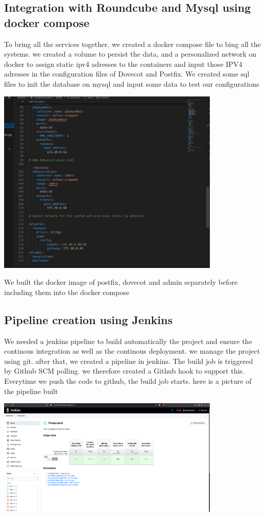 \documentclass[12pt]{article}
\begin{document}
\subsection{Integration with Roundcube and Mysql using docker compose }
To bring all the services together, we created a docker compose file to bing all the systems. we created a volume to persist the data, and a personalized network on docker to assign static ipv4 adresses to the containers and input those IPV4 adresses in the configuration files 
of Dovecot and Postfix.  We created some sql files to init the database on mysql and input some data to test our configurations
\begin{center}
    \includegraphics[width=0.8\textwidth]{compose.png}
     \label{compose.png}
\end{center}
We built the docker image of postfix, dovecot and admin separately before including them into the docker compose
\subsection{Pipeline creation using Jenkins}
We needed a jenkins pipeline to build automatically the project and ensure the continous integration as well as the continous deployment. we manage the project using git. 
after that, we created a pipeline in jenkins. The build job is triggered by Github SCM polling. we therefore created a Github hook to support this. Everytime we push the code to github, the build job starts. 
here is a picture of the pipeline built
\begin{center}
    \includegraphics[width=0.8\textwidth]{pipeline.png}
     \label{pipeline.png}
\end{center}
\end{document}
